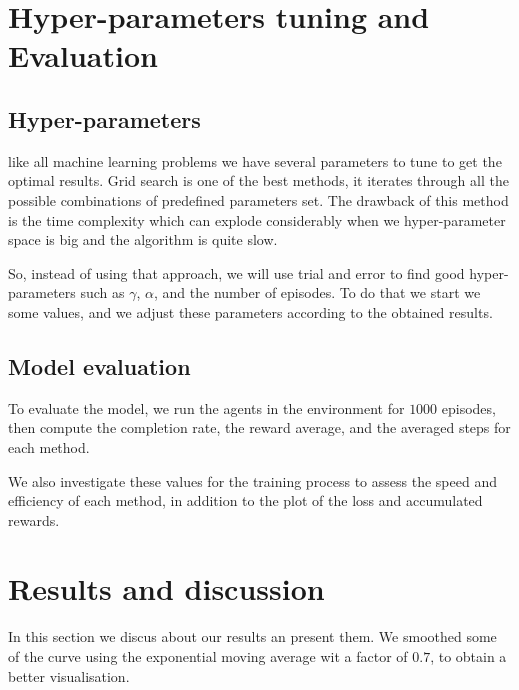 \section{Hyper-parameters tuning and Evaluation}\label{sec5}
\subsection{Hyper-parameters}
like all machine learning problems we have several parameters to tune to get the optimal results. Grid search is one of the best methods, it iterates through all the possible combinations of predefined parameters set. The drawback of this method is the time complexity which can explode considerably when we hyper-parameter space is big and the algorithm is quite slow.

So, instead of using that approach, we will use trial and error to find good hyper-parameters such as $\gamma$, $\alpha$, and the number of episodes. To do that we start we some values, and we adjust these parameters according to the obtained results.

\subsection{Model evaluation}
To evaluate the model, we run the agents in the environment for $1000$ episodes, then compute the completion rate, the reward average, and the averaged steps for each method.

We also investigate these values for the training process to assess the speed and efficiency of each method, in addition to the plot of the loss and accumulated rewards.
\section{Results and discussion}\label{sec6}
In this section we discus about our results an present them. We smoothed some of the curve using the exponential moving average wit a factor of $0.7$, to obtain a better visualisation.
